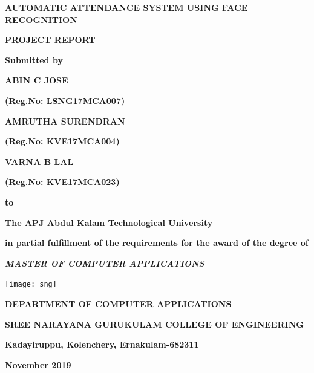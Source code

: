 \documentclass[a4paper, 12pt]{report}
\begin{document}
\begin{titlepage}
	\centering
	\vspace{0.4cm}
	{\bfseries\fontsize{16pt}{16pt}\selectfont AUTOMATIC ATTENDANCE SYSTEM USING FACE RECOGNITION \par}
	\vspace{.6cm}
	{\bfseries\fontsize{12pt}{12pt}\selectfont PROJECT REPORT \par}
	\vspace{.6cm}
		{\fontsize{12pt}{12pt}\selectfont\bfseries Submitted by \par}
		
	\vspace{.6cm}
	{\fontsize{14pt}{14pt}\selectfont\bfseries ABIN C JOSE}
		{\fontsize{12pt}{12pt}\selectfont\bfseries (Reg.No: LSNG17MCA007)\par}
	\vspace{.6cm}
	{\fontsize{14pt}{14pt}\selectfont\bfseries\hspace{3cm} AMRUTHA SURENDRAN}
		{\fontsize{12pt}{12pt}\selectfont\bfseries (Reg.No: KVE17MCA004)\par}
	\vspace{.6cm}
	{\fontsize{14pt}{14pt}\selectfont\bfseries VARNA B LAL}
		{\fontsize{12pt}{12pt}\selectfont\bfseries (Reg.No: KVE17MCA023)\par}
	\vspace{.6cm}
	
	
	{\fontsize{12pt}{12pt}\selectfont\bfseries  to \par}
	\vspace{.6cm}
	{\bfseries\fontsize{12pt}{12pt}\selectfont The APJ Abdul Kalam Technological University \par}
	\vspace{.2cm}	
	{\fontsize{12pt}{12pt}\selectfont\bfseries {in partial fulfillment of the requirements for the award of the degree of} \par}	
	\vspace{.8cm}
	{\fontsize{12pt}{12pt}\selectfont\bfseries \textit{ MASTER OF COMPUTER APPLICATIONS} \par}
	\vspace{.8cm}
\texttt{[image: sng]}\par\vspace{0.1cm}
	{\bfseries\fontsize{14pt}{14pt}\selectfont DEPARTMENT OF COMPUTER APPLICATIONS\par}
	\vspace{0.6cm}
	{\bfseries\fontsize{14pt}{14pt}\selectfont SREE NARAYANA GURUKULAM COLLEGE OF ENGINEERING\par}
	\vspace{0.2cm}
	{\bfseries\fontsize{14pt}{14pt}\selectfont Kadayiruppu, Kolenchery, Ernakulam-682311 \par}
	\vspace{0.2cm}
	{\bfseries\fontsize{14pt}{14pt}\selectfont November 2019 \par}
\end{titlepage}
\end{document}
